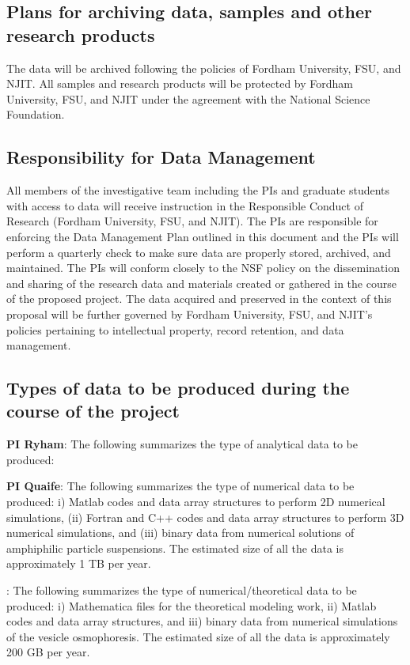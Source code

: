 \documentclass[11pt]{article}
\begin{document}
\subsection*{Plans for archiving data, samples and other research
products}
The data will be archived following the policies of Fordham University,
FSU, and NJIT. All samples and research products will be protected by
Fordham University, FSU, and NJIT under the agreement with the National
Science Foundation.

\subsection*{Responsibility for Data Management}
All members of the investigative team including the PIs and graduate
students with access to data will receive instruction in the Responsible
Conduct of Research (Fordham University, FSU, and NJIT). The PIs are
responsible for enforcing the Data Management Plan outlined in this
document and the PIs will perform a quarterly check to make sure data
are properly stored, archived, and maintained. The PIs will conform
closely to the NSF policy on the dissemination and sharing of the
research data and materials created or gathered in the course of the
proposed project. The data acquired and preserved in the context of
this proposal will be further governed by Fordham University, FSU, and
NJIT's policies pertaining to intellectual property, record retention,
and data
management.

\subsection*{Types of data to be produced during the course of the
project}
{\bf PI Ryham}: The following summarizes the type of analytical data to
be produced: 

\noindent
{\bf PI Quaife}: The following summarizes the type of numerical data to
be produced: i) Matlab codes and data array structures to perform 2D
numerical simulations, (ii) Fortran and C++ codes and data array
structures to perform 3D numerical simulations, and (iii) binary data
from numerical solutions of amphiphilic particle suspensions. The
estimated size of all the data is approximately 1 TB per year. 

: The following summarizes the type of
numerical/theoretical data to be produced: i) Mathematica files for the
theoretical modeling work, ii) Matlab codes and data array structures,
and iii) binary data from numerical simulations of the vesicle
osmophoresis. The estimated size of all the data is approximately 200 GB
per year. 
\end{document}
